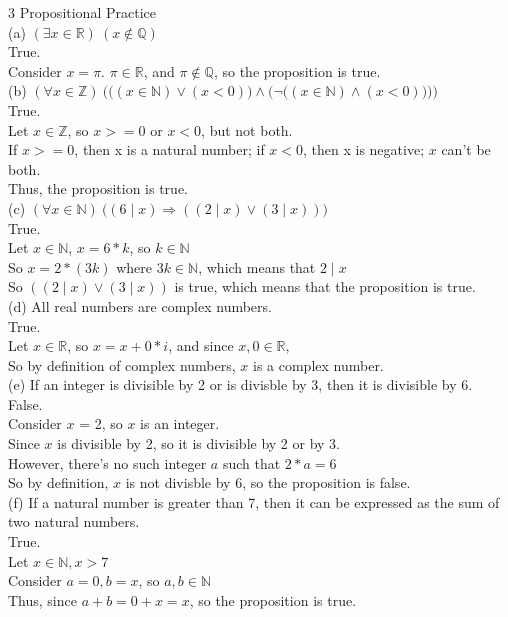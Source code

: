 \documentclass{article}
\begin{document}
{\Large 3 Propositional Practice} \\[.3cm]
(a) $(\exists x\in\mathbb{R})\ (x\notin\mathbb{Q})$\\[.15cm]
\indent True.\\
\indent Consider $x = \pi$. $\pi\in\mathbb{R}$, and $\pi\notin\mathbb{Q}$, so the proposition is true.\\[.3cm]
(b) $(\forall x\in\mathbb{Z})\ \bigg(\Big((x\in\mathbb{N})\lor(x<0)\Big)\land \Big(\neg\big((x\in\mathbb{N})\land(x<0)\big)\Big) \bigg)$\\[.15cm]
\indent True.\\
\indent Let $x\in\mathbb{Z}$, so $x>=0$ or $x<0$, but not both.\\
\indent If $x>=0$, then x is a natural number; if $x<0$, then x is negative; $x$ can't be both.\\
\indent Thus, the proposition is true.\\[.3cm]
(c) $(\forall x\in\mathbb{N})\ \big((6\mid x)\Longrightarrow((2\mid x)\lor (3\mid x))\big)$\\[.15cm]
\indent True.\\
\indent Let $x\in\mathbb{N}$, $x = 6*k$, so $k\in\mathbb{N}$\\
\indent So $x = 2*(3k)$ where $3k\in\mathbb{N}$, which means that $2\mid x$\\
\indent So $((2\mid x)\lor (3\mid x))$ is true, which means that the proposition is true.\\[.3cm]
(d) All real numbers are complex numbers.\\[.15cm]
\indent True.\\
\indent Let $x\in\mathbb{R}$, so $x = x + 0*i$, and since $x, 0\in\mathbb{R}$,\\
\indent So by definition of complex numbers, $x$ is a complex number.\\[0.3cm]
(e) If an integer is divisible by 2 or is divisble by 3, then it is divisible by 6.\\[.15cm]
\indent False.\\
\indent Consider $x$ = 2, so $x$ is an integer.\\
\indent Since $x$ is divisible by 2, so it is divisible by 2 or by 3.\\
\indent However, there's no such integer $a$ such that $2 * a = 6$\\
\indent So by definition, $x$ is not divisble by 6, so the proposition is false.\\[0.3cm]
(f) If a natural number is greater than 7, then it can be expressed as the sum of two natural numbers.\\[.15cm]
\indent True.\\
\indent Let $x\in\mathbb{N}, x > 7$\\
\indent Consider $a = 0, b = x$, so $a, b\in\mathbb{N}$\\
\indent Thus, since $a + b = 0 + x = x$, so the proposition is true.
\end{document}
